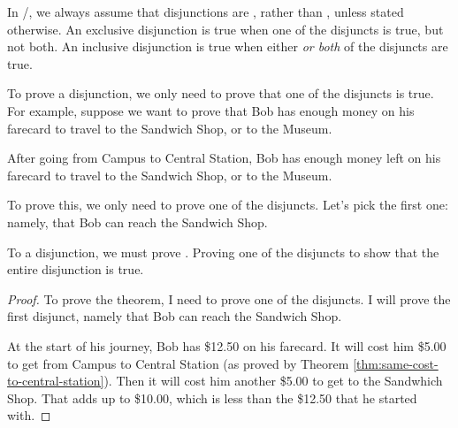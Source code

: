 \documentclass[../../../main.tex]{subfiles}
\begin{document}
\begin{aside}
  \begin{remark}
    In \math/, we always assume that disjunctions are , rather than , unless stated otherwise. An exclusive disjunction is true when one of the disjuncts is true, but not both. An inclusive disjunction is true when either \emph{or both} of the disjuncts are true.
  \end{remark}
\end{aside}

To prove a disjunction, we only need to prove that one of the disjuncts is true. For example, suppose we want to prove that Bob has enough money on his farecard to travel to the Sandwich Shop, or to the Museum.

\begin{framed}
  \begin{theorem}
    \label{thm:bob-can-get-to-sandwich-shop-or-museum}
    After going from Campus to Central Station, Bob has enough money left on his farecard to travel to the Sandwich Shop, or to the Museum.
  \end{theorem}
\end{framed}

To prove this, we only need to prove one of the disjuncts. Let's pick the first one: namely, that Bob can reach the Sandwich Shop.

\begin{aside}
  \begin{remark}
    To  a disjunction, we must prove . Proving one of the disjuncts  to show that the entire disjunction is true.
  \end{remark}
\end{aside}

\begin{framed}
  \begin{proof}
    To prove the theorem, I need to prove one of the disjuncts. I will prove the first disjunct, namely that Bob can reach the Sandwich Shop. 
        
    At the start of his journey, Bob has \$12.50 on his farecard. It will cost him \$5.00 to get from Campus to Central Station (as proved by Theorem \ref{thm:same-cost-to-central-station}). Then it will cost him another \$5.00 to get to the Sandwhich Shop. That adds up to \$10.00, which is less than the \$12.50 that he started with.
  \end{proof}
\end{framed}
\end{document}
